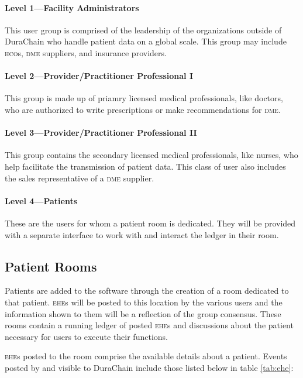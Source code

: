 \paragraph{Level 1---Facility Administrators}
This user group is comprised of the leadership of the organizations outside of DuraChain who handle patient data on a global scale. This group may include \textsc{hco}s, \textsc{dme} suppliers, and insurance providers.%

\paragraph{Level 2---Provider/Practitioner Professional I}
This group is made up of priamry licensed medical professionals, like doctors, who are authorized to write prescriptions or make recommendations for \textsc{dme}.%

\paragraph{Level 3---Provider/Practitioner Professional II}
This group contains the secondary licensed medical professionals, like nurses, who help facilitate the transmission of patient data. This class of user also includes the sales representative of a \textsc{dme} supplier.%

\paragraph{Level 4---Patients}
These are the users for whom a patient room is dedicated. They will be provided with a separate interface to work with and interact the ledger in their room.%

\subsection{Patient Rooms}
Patients are added to the software through the creation of a room dedicated to that patient. \textsc{ehe}s will be posted to this location by the various users and the information shown to them will be a reflection of the group consensus. These rooms contain a running ledger of posted \textsc{ehe}s and discussions about the patient necessary for users to execute their functions.%

\textsc{ehe}s posted to the room comprise the available details about a patient. Events posted by and visible to DuraChain include those listed below in table \ref{tab:ehe}:%



